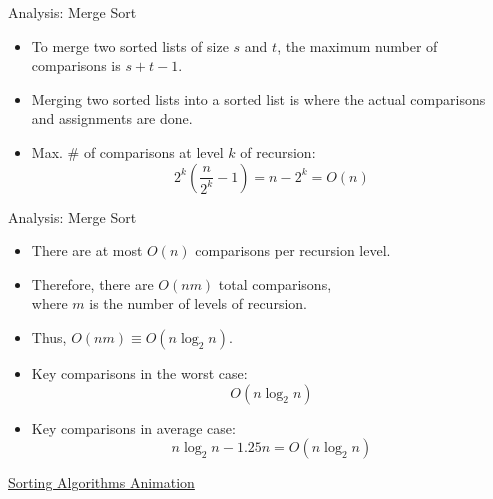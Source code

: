 \documentclass[14pt,aspectratio=1610]{beamer}
\begin{document}
\begin{frame}{Analysis: Merge Sort}
\begin{itemize}[<+->]
\item
  To merge two sorted lists of size $s$ and $t$, the maximum number of comparisons is $s + t - 1$.
\item
  Merging two sorted lists into a sorted list is where the actual comparisons and assignments are done.
\item
  Max. \# of comparisons at level $k$ of recursion:
  \begin{equation*}
    2^k\left(\frac{n}{2^k} - 1\right) = n - 2^k = O(n)
  \end{equation*}
\end{itemize}
\end{frame}

\begin{frame}{Analysis: Merge Sort}
\begin{itemize}[<+->]
\item
  There are at most \(O(n)\) comparisons per recursion level.
\item
  Therefore, there are \(O(nm)\) total comparisons, \\where \(m\) is the number of levels of recursion.
\item
  Thus, \(O(nm) \equiv O(n \log_2n)\).

\item
  Key comparisons in the worst case:\\[-1em]
    \begin{equation*}
      O\left(n\log_2n\right)
    \end{equation*}
\item
  Key comparisons in average case:\\[-1em]
    \begin{equation*}
      n\log_2n - 1.25n = O\left(n\log_2n\right)
    \end{equation*}
\end{itemize}
\end{frame}

\begin{frame}{}
\Large\centering{}
\href{https://www.toptal.com/developers/sorting-algorithms}{Sorting Algorithms Animation}
\end{frame}

\end{document}
